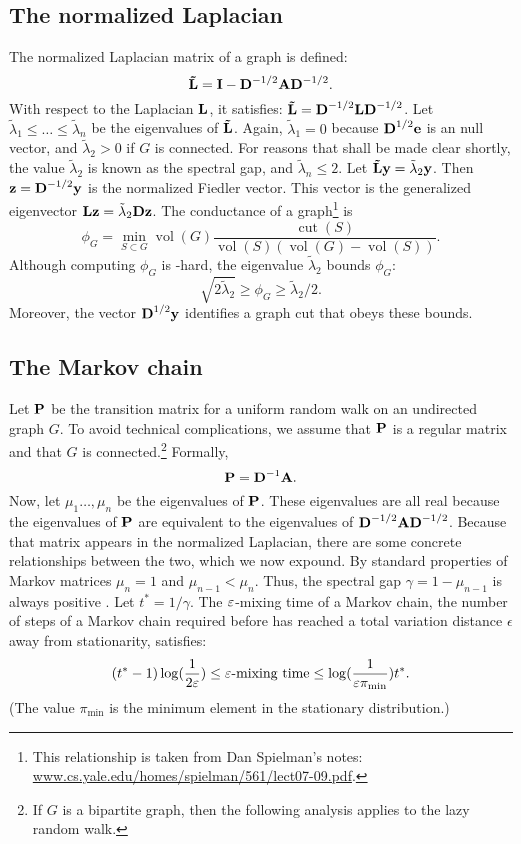 \documentclass[nofonts]{dgleich-article}
\DeclareMathOperator{\vol}{vol}
\DeclareMathOperator{\cut}{cut}
\newcommand{\mnL}{\mat{\tilde{L}}}
\newcommand{\tlambda}{\tilde{\lambda}}
\begin{document}
\subsection{The normalized Laplacian}
The normalized Laplacian matrix of a graph is defined:
\[ \mnL = \eye - \mD^{-1/2} \mA \mD^{-1/2}. \]
With respect to the Laplacian $\boldsymbol{\mathrm{L}}$, it satisfies: $\mnL = \mD^{-1/2} \mL \mD^{-1/2}$.
Let $\tlambda_1 \le \ldots \le \tlambda_n$ be the eigenvalues of $\mnL$.
Again, $\tlambda_1 = 0$ because $\boldsymbol{\mathrm{D}}^{1/2} \boldsymbol{\mathrm{e}}$ is an null vector,
and $\tlambda_2 > 0$ if $G$ is connected.  For reasons that shall be made
clear shortly, the value $\tlambda_2$ is known as the spectral gap, 
and $\tlambda_n \le 2$.
Let $\mnL \vy = \tlambda_2 \vy$.
Then $\boldsymbol{\mathrm{z}} = \boldsymbol{\mathrm{D}}^{-1/2} \boldsymbol{\mathrm{y}}$ is the normalized Fiedler vector.  This vector 
is the generalized eigenvector $\mL \vz = \tlambda_2 \mD \vz$.
The conductance of a graph\footnote{This relationship is taken 
from Dan Spielman's notes: \url{www.cs.yale.edu/homes/spielman/561/lect07-09.pdf}.}
is 
\[ \phi_G = \min_{S \subset G} \vol(G) \frac{\cut(S)}{\vol(S) (\vol(G) - \vol(S))}. \]
Although computing $\phi_G$ is -hard, 
the eigenvalue $\tlambda_2$ bounds $\phi_G$: 
\[ \sqrt{2 \tlambda_2}  \ge \phi_G \ge \tlambda_2/2. \]
Moreover, the vector $\boldsymbol{\mathrm{D}}^{1/2} \boldsymbol{\mathrm{y}}$ identifies a graph cut that obeys these bounds.  


\subsection{The Markov chain}
Let $\boldsymbol{\mathrm{P}}$ be the transition matrix for a uniform random walk on an undirected graph $G$.  To avoid
technical complications, we assume that $\boldsymbol{\mathrm{P}}$ is a regular matrix and that $G$ 
is connected.\footnote{If $G$ is a bipartite graph, then the following analysis applies
to the lazy random walk.}
Formally, 
\[ \boldsymbol{\mathrm{P}} = \boldsymbol{\mathrm{D}}^{-1} \boldsymbol{\mathrm{A}}. \]
Now, let $\mu_1 \ldots, \mu_n$ be the eigenvalues of $\boldsymbol{\mathrm{P}}$.  These eigenvalues are all
real because the eigenvalues of $\boldsymbol{\mathrm{P}}$ are equivalent to the eigenvalues of 
$\boldsymbol{\mathrm{D}}^{-1/2} \boldsymbol{\mathrm{A}} \boldsymbol{\mathrm{D}}^{-1/2}$.  Because that matrix appears in the normalized Laplacian, there 
are some concrete relationships between the two, which we now expound. By standard properties
of Markov matrices $\mu_n = 1$ and $\mu_{n-1} < \mu_n$.  Thus,
the spectral gap $\gamma = 1-\mu_{n-1}$ is always positive \cite{levin2008-markov}.  Let $t^* = 1/\gamma$.
The $\varepsilon$-mixing time of a Markov chain, the number of steps of a Markov chain required before
has reached a total variation distance $\epsilon$ away from stationarity, satisfies: 
\[ (t^* -1) \log( \frac{1}{2\varepsilon} ) \le \varepsilon\text{-mixing time} 
     \le \log (\frac{1}{\varepsilon \pi_{\text{min}} }) t^{*}. \]
(The value $ \pi_{\text{min}}$ is the minimum element in the stationary distribution.)
\end{document}
